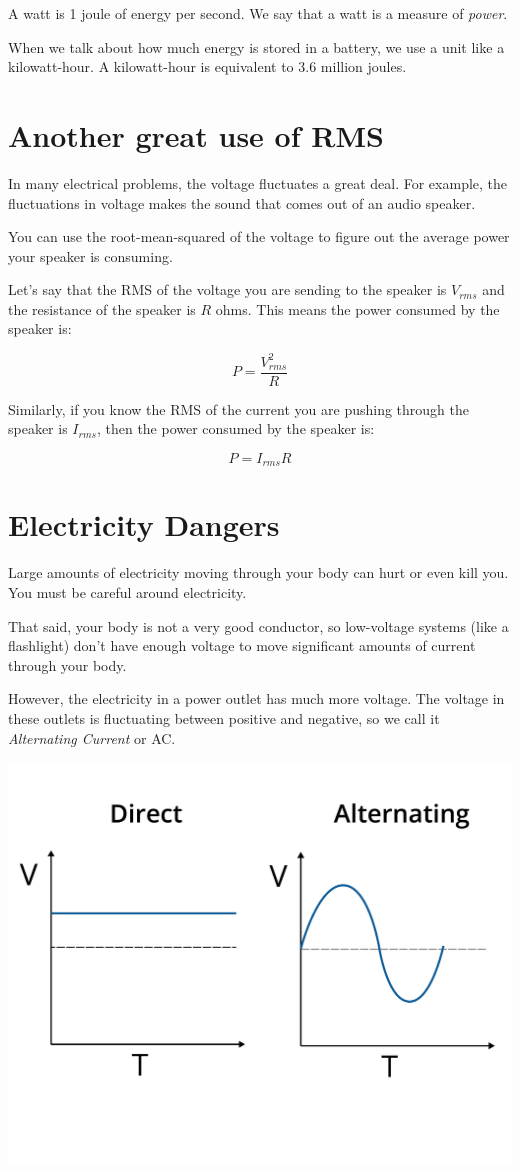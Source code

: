 A watt is 1 joule of energy per second. We say that a watt is a
measure of \textit{power}.

When we talk about how much energy is stored in a battery, we use a
unit like a kilowatt-hour. A kilowatt-hour is equivalent to 3.6 million
joules.

\section{Another great use of RMS}

In many electrical problems, the voltage fluctuates a great deal.  For
example, the fluctuations in voltage makes the sound that comes out of an
audio speaker.

You can use the root-mean-squared of the voltage to figure out the average power
your speaker is consuming.

Let's say that the RMS of the voltage you are sending to the speaker is $V_{rms}$
and the resistance of the speaker is $R$ ohms. This means the power consumed
by the speaker is:

$$P = \frac{V_{rms}^2}{R}$$

Similarly, if you know the RMS of the current you are pushing through
the speaker is $I_{rms}$, then the power consumed by the speaker is:

$$P = I_{rms} R$$

\section{Electricity Dangers}

Large amounts of electricity moving through your body can hurt or even kill
you. You must be careful around electricity.

That said, your body is not a very good conductor, so low-voltage
systems (like a flashlight) don't have enough voltage to move significant amounts of
current through your body.

However, the  electricity in a power outlet has much more voltage. The voltage
in these outlets is fluctuating between positive and negative, so we
call it \textit{Alternating Current} or AC.

\includegraphics[width=.75\textwidth]{AC_vs_DC.png}

